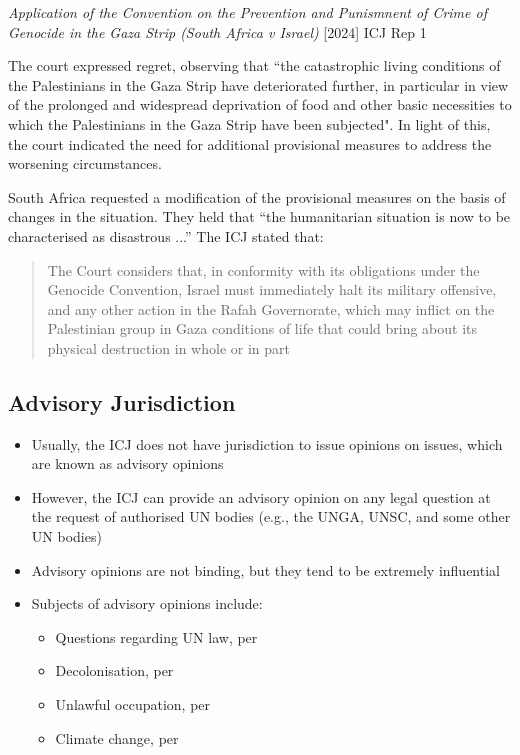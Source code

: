 \begin{casedetails}{\textit{Application of the Convention on the Prevention and Punismnent of Crime of Genocide in the Gaza Strip (South Africa v Israel)} [2024] ICJ Rep 1}
    \vspace{\baselineskip}

    The court expressed regret, observing that ``the catastrophic living conditions of the Palestinians in the Gaza Strip have deteriorated further, in particular in view of the prolonged and widespread deprivation of food and other basic necessities to which the Palestinians in the Gaza Strip have been subjected". In light of this, the court indicated the need for additional provisional measures to address the worsening circumstances.
    
    South Africa requested a modification of the provisional measures on the basis of changes in the situation. They held that ``the humanitarian situation is now to be characterised as disastrous ...'' The ICJ stated that:
    \begin{quote}
        The Court considers that, in conformity with its obligations under the Genocide Convention, Israel must immediately halt its military offensive, and any other action in the Rafah Governorate, which may inflict on the Palestinian group in Gaza conditions of life that could bring about its physical destruction in whole or in part
    \end{quote}
\end{casedetails}

\subsection{Advisory Jurisdiction}
\begin{itemize}
    \item Usually, the ICJ does not have jurisdiction to issue opinions on issues, which are known as advisory opinions
    \item However, the ICJ can provide an advisory opinion on any legal question at the request of authorised UN bodies (e.g., the UNGA, UNSC, and some other UN bodies)
    \item Advisory opinions are not binding, but they tend to be extremely influential
    \item Subjects of advisory opinions include:
    \begin{itemize}
        \item Questions regarding UN law, per 
        \item Decolonisation, per 
        \item Unlawful occupation, per 
        \item Climate change, per 
    \end{itemize}
\end{itemize}